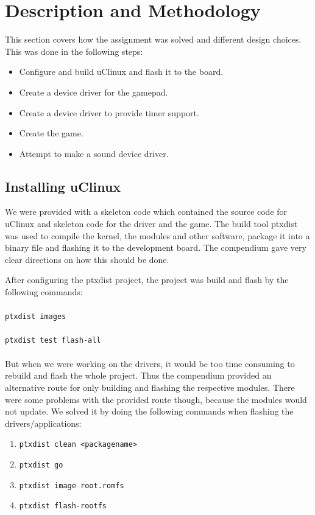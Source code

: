 \section{Description and Methodology}\label{chapter:Description and Methodology}
This section covers how the assignment was solved and different design choices. This was done in the following steps:

\begin{itemize}
	\item Configure and build uClinux and flash it to the board.  
	\item Create a device driver for the gamepad.
	\item Create a device driver to provide timer support. 
	\item Create the game. 
	\item Attempt to make a sound device driver. 
\end{itemize}


\subsection{Installing uClinux}
 

We were provided with a skeleton code which contained the source code for uClinux and skeleton code for the driver and the game. The build tool ptxdist was used to compile the kernel, the modules and other software, package it into a binary file and flashing it to the development board. The compendium gave very clear directions on how this should be done\cite{compendium}.

After configuring the ptxdist project, the project was build and flash by the following commands:
\hfill \\
\hfill \\
\texttt{ptxdist images} 
\hfill \\
\hfill \\
\texttt{ptxdist test flash-all}
\hfill \\
\hfill \\
But when we were working on the drivers, it would be too time consuming to rebuild and flash the whole project. Thus the compendium provided an alternative route for only building and flashing the respective modules. There were some problems with the provided route though, because the modules would not update. We solved it by doing the following commands when flashing the drivers/applications:

\begin{enumerate}
	\item \texttt{ptxdist clean <packagename>}
	\item \texttt{ptxdist go}
	\item \texttt{ptxdist image root.romfs}
	\item \texttt{ptxdist flash-rootfs} 
\end{enumerate}


